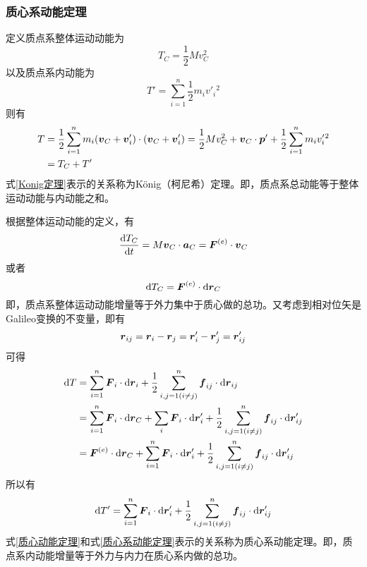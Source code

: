 \subsubsection{质心系动能定理}

定义{\heiti 质点系整体运动动能}为
\begin{equation}
	T_C = \frac12 M v_C^2
\end{equation}
以及{\heiti 质点系内动能}为
\begin{equation}
	T' = \sum_{i=1}^n \frac12 m_i v'_i{}^2
\end{equation}
则有
\begin{align}
	T & = \frac12 \sum_{i=1}^n m_i(\boldsymbol{v}_C + \boldsymbol{v}'_i) \cdot (\boldsymbol{v}_C + \boldsymbol{v}'_i) = \frac12 M v_C^2 + \boldsymbol{v}_C \cdot \boldsymbol{p}' + \frac12\sum_{i=1}^n m_i v'_i{}^2 \nonumber \\
	& = T_C + T' \label{Konig定理}
\end{align}
式\eqref{Konig定理}表示的关系称为{\heiti K\"onig（柯尼希）定理}。即，质点系总动能等于整体运动动能与内动能之和。

根据整体运动动能的定义，有
\begin{equation}
	\frac{\mathrm{d} T_C}{\mathrm{d} t} = M\boldsymbol{v}_C \cdot \boldsymbol{a}_C = \boldsymbol{F}^{(e)} \cdot \boldsymbol{v}_C
\end{equation}
或者
\begin{equation}
	\mathrm{d}T_C = \boldsymbol{F}^{(e)} \cdot \mathrm{d} \boldsymbol{r}_C
	\label{质心动能定理}
\end{equation}
即，质点系整体运动动能增量等于外力集中于质心做的总功。又考虑到相对位矢是Galileo变换的不变量，即有
\begin{equation*}
	\boldsymbol{r}_{ij} = \boldsymbol{r}_i - \boldsymbol{r}_j = \boldsymbol{r}'_i - \boldsymbol{r}'_j = \boldsymbol{r}'_{ij}
\end{equation*}
可得
\begin{align*}
	\mathrm{d} T & = \sum_{i=1}^n \boldsymbol{F}_i \cdot \mathrm{d} \boldsymbol{r}_i + \frac12 \sum_{i,j=1(i\neq j)}^n \boldsymbol{f}_{ij} \cdot \mathrm{d} \boldsymbol{r}_{ij} \\
	& = \sum_{i=1}^n \boldsymbol{F}_i \cdot \mathrm{d} \boldsymbol{r}_C + \sum_i \boldsymbol{F}_i \cdot \mathrm{d} \boldsymbol{r}'_i + \frac12 \sum_{i,j=1(i\neq j)}^n \boldsymbol{f}_{ij} \cdot \mathrm{d} \boldsymbol{r}'_{ij} \\
	& = \boldsymbol{F}^{(e)} \cdot \mathrm{d} \boldsymbol{r}_C + \sum_{i=1}^n \boldsymbol{F}_i \cdot \mathrm{d} \boldsymbol{r}'_i + \frac12 \sum_{i,j=1(i \neq j)}^n \boldsymbol{f}_{ij} \cdot \mathrm{d} \boldsymbol{r}'_{ij}
\end{align*}
所以有
\begin{equation}
	\mathrm{d} T' = \sum_{i=1}^n \boldsymbol{F}_i \cdot \mathrm{d} \boldsymbol{r}'_i + \frac12 \sum_{i,j=1(i \neq j)}^n \boldsymbol{f}_{ij} \cdot \mathrm{d} \boldsymbol{r}'_{ij}
	\label{质心系动能定理}
\end{equation}
式\eqref{质心动能定理}和式\eqref{质心系动能定理}表示的关系称为{\heiti 质心系动能定理}。即，质点系内动能增量等于外力与内力在质心系内做的总功。

